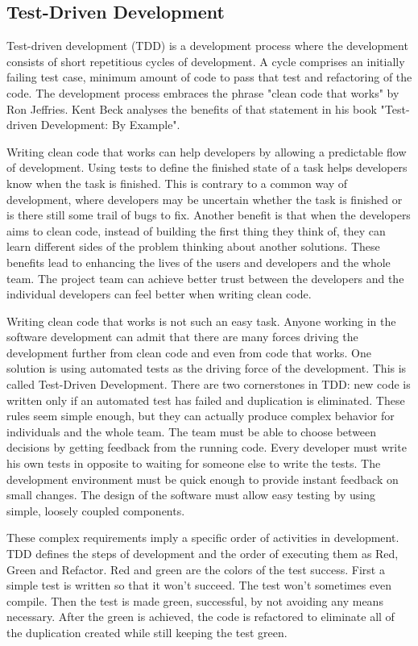 \subsection{Test-Driven Development} 
Test-driven development (TDD) is a development process where the development consists of short repetitious cycles of development. A cycle comprises an initially failing test case, minimum amount of code to pass that test and refactoring of the code. The development process embraces the phrase "clean code that works" by Ron Jeffries. Kent Beck analyses the benefits of that statement in his book "Test-driven Development: By Example".

Writing clean code that works can help developers by allowing a predictable flow of development. Using tests to define the finished state of a task helps developers know when the task is finished. This is contrary to a common way of development, where developers may be uncertain whether the task is finished or is there still some trail of bugs to fix. Another benefit is that when the developers aims to clean code, instead of building the first thing they think of, they can learn different sides of the problem thinking about another solutions. These benefits lead to enhancing the lives of the users and developers and the whole team. The project team can achieve better trust between the developers and the individual developers can feel better when writing clean code.

Writing clean code that works is not such an easy task. Anyone working in the software development can admit that there are many forces driving the development further from clean code and even from code that works. One solution is using automated tests as the driving force of the development. This is called Test-Driven Development. There are two cornerstones in TDD: new code is written only if an automated test has failed and duplication is eliminated. These rules seem simple enough, but they can actually produce complex behavior for individuals and the whole team. The team must be able to choose between decisions by getting feedback from the running code. Every developer must write his own tests in opposite to waiting for someone else to write the tests. The development environment must be quick enough to provide instant feedback on small changes. The design of the software must allow easy testing by using simple, loosely coupled components.

These complex requirements imply a specific order of activities in development. TDD defines the steps of development and the order of executing them as Red, Green and Refactor. Red and green are the colors of the test success. First a simple test is written so that it won't succeed. The test won't sometimes even compile. Then the test is made green, successful, by not avoiding any means necessary. After the green is achieved, the code is refactored to eliminate all of the duplication created while still keeping the test green.~\cite{beck2003test}


